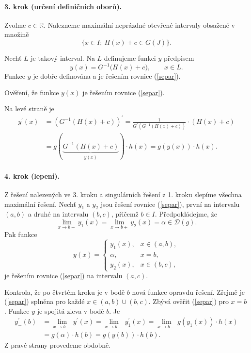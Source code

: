 \paragraph{3. krok (určení definičních oborů).}
Zvolme $c\in\mathbb R$. Nalezneme maximální neprázdné otevřené intervaly obsažené v množině
\[
\{x\in I;\ H(x)+c\in G(J)\}.
\]

Nechť $L$ je takový interval. Na $L$ definujeme funkci $y$ předpisem
\[
y(x)=G^{-1}\bigl(H(x)+c\bigr),\qquad x\in L.
\]
Funkce $y$ je dobře definována a je řešením rovnice (\ref{separ}).

Ověření, že funkce $y(x)$ je řešením rovnice (\ref{separ}).

Na levé straně je
\begin{align*}
	y^\prime(x) &= \left( G^{-1}(H(x)+c) \right ) ^\prime = \frac{1}{G^\prime \left( G^{-1}(H(x)+c) \right ) }\cdot (H(x)+c)\\
	&=g ( \underbrace{G^{-1}(H(x)+c)}_{y(x)} )\cdot h(x) = g(y(x))\cdot h(x).
\end{align*}

\paragraph{4. krok (lepení).}
Z řešení nalezených ve 3. kroku a singulárních řešení z 1. kroku slepíme všechna maximální řešení.
Nechť $y_1$ a $y_2$ jsou řešení rovnice (\ref{separ}), první na intervalu $(a,b)$ a druhé na intervalu $(b,c)$,
přičemž $b\in I$. Předpokládejme, že
\[
\lim_{x\to b-}y_1(x)=\lim_{x\to b+}y_2(x)=\alpha\in \mathcal D(g).
\]
Pak funkce
\[
y(x)=
\begin{cases}
y_1(x), & x\in(a,b),\\
\alpha, & x=b,\\
y_2(x), & x\in(b,c),
\end{cases}
\]
je řešením rovnice (\ref{separ}) na intervalu $(a,c)$.


Kontrola, že po čtvrtém kroku je v bodě $b$ nová funkce opravdu řešení. Zřejmě je (\ref{separ}) splněna pro každé
$x \in (a,b) \cup (b,c)$. Zbývá ověřit (\ref{separ}) pro $x=b$. Funkce $y$ je spojitá zleva v bodě $b$. Je
\begin{align*}
	y_-^\prime(b) &= \lim_{x \to b-} y^\prime(x) = \lim_{x \to b-} y_1^\prime(x) = \lim_{x \to b-} g(y_1(x))\cdot h(x)\\
	&= g(\alpha)\cdot h(b)=g(y(b))\cdot h(b).
\end{align*}
Z pravé strany provedeme obdobně.
